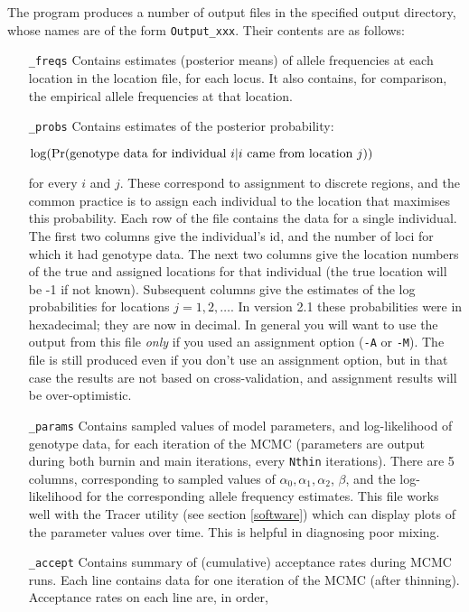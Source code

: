 \documentclass[10pt,titlepage,times,letterpaper]{article}
\def \Pr{{\rm Pr}}
\begin{document}
The program produces a number of output files in the specified output directory,
whose names are of the form {\tt Output\_xxx}. Their
contents are as follows:
\begin{enumerate}[\_params]
\item[{\tt \_freqs}] Contains estimates (posterior means) of allele
frequencies at each location in the location file, for each locus. It also contains,
for comparison, the empirical allele frequencies at that location.

\item[{\tt \_probs}] Contains estimates of the posterior probability:

$\log(\Pr(\text{genotype
data for individual $i$} | \text{$i$ came from location $j$}))$ 

for every $i$ and $j$. These correspond to assignment to discrete
regions, and the common practice is to assign each individual
to the location that maximises this probability. Each row of the file
contains the data for a single individual. The first two columns give
the individual's id, and the number of loci for which it had genotype
data.  The next two columns give the location numbers of the
true and assigned locations for that individual (the true location
will be -1 if not known).
Subsequent columns give the estimates of the log
probabilities for locations $j=1,2,\dots$.  In version 2.1
these probabilities were in hexadecimal; they are now in decimal.
In general you will want to
use the output from this file {\it only} if you used an
assignment option ({\tt -A} or {\tt -M}).
The file is still produced even if you
don't use an assignment option, but in that case the results are not
based on cross-validation, and assignment results will be
over-optimistic.
\item[{\tt \_params}] Contains sampled values of model parameters, and
log-likelihood of genotype data, for each iteration of the MCMC
(parameters are output during both burnin and main iterations, every
{\tt Nthin} iterations). There are 5 columns, corresponding to sampled
values of $\alpha_0, \alpha_1, \alpha_2$, $\beta$, and the
log-likelihood for the corresponding allele frequency estimates.
This file works well with the Tracer utility (see section \ref{software}) 
which can display plots of the parameter values over time.  This is helpful in diagnosing poor mixing.
\item[{\tt \_accept}] Contains summary of (cumulative) acceptance rates
during MCMC runs. Each line contains data for one iteration of the
MCMC (after thinning). Acceptance rates on each line are, in order,

\end{enumerate}
\end{document}
